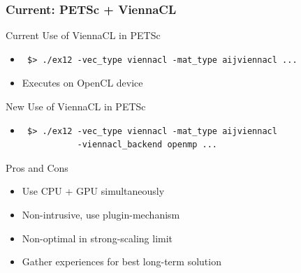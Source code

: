 \begin{frame}[fragile]
\frametitle{Current: PETSc + ViennaCL}

  \begin{block}{Current Use of ViennaCL in PETSc}
  \begin{itemize}
   \item 
  \begin{lstlisting}
 $> ./ex12 -vec_type viennacl -mat_type aijviennacl ...
  \end{lstlisting}
   \item Executes on OpenCL device
  \end{itemize}
  \end{block}

  
  \begin{block}{New Use of ViennaCL in PETSc}
  \begin{itemize}
   \item 
  \begin{lstlisting}
 $> ./ex12 -vec_type viennacl -mat_type aijviennacl
           -viennacl_backend openmp ...
  \end{lstlisting}
  \end{itemize}
  \end{block}

  
  \begin{block}{Pros and Cons}
  \begin{itemize}
   \item Use CPU + GPU simultaneously
   \item Non-intrusive, use plugin-mechanism
   \item Non-optimal in strong-scaling limit
   \item Gather experiences for best long-term solution
  \end{itemize}
  \end{block}

\end{frame}


